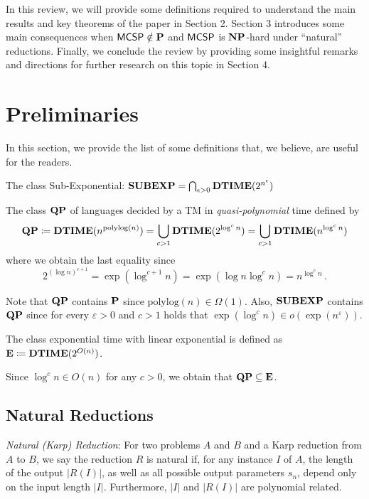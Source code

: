 \documentclass[11pt]{article}
\begin{document}
In this review, we will provide some definitions required to understand the main results and key theorems of the paper in Section 2. Section 3 introduces some main consequences when $\mathprob{MCSP} \notin \P$ and $\mathprob{MCSP}$ is $\NP$-hard under ``natural'' reductions. Finally, we conclude the review by providing some insightful remarks and directions for further research on this topic in Section 4.

\section{Preliminaries}

In this section, we provide the list of some definitions that, we believe, are useful for the readers.

\begin{definition}
	The class Sub-Exponential: $\class{SUBEXP} = \bigcap_{\epsilon > 0} \TIME(2^{n^{\epsilon}})$
\end{definition}

\begin{definition}
	The class $\class{QP}$ of languages decided by a TM in
	\emph{quasi-polynomial} time defined by
	\[
	\class{QP}
	\coloneqq
	\TIME(n^{\mathrm{polylog}(n)})
	=
	\bigcup_{c > 1}\TIME(2^{\log^c n})
	=
	\bigcup_{c > 1}\TIME(n^{\log^c n})
	\]
	where we obtain the last equality since
	\[
	2^{(\log n)^{c+1}} = \exp( \log^{c+1} n ) = \exp( \log n \log^c n )
	= n^{\log^c n} \,.
	\]
\end{definition}

Note that $\class{QP}$ contains $\P$ since
$\mathrm{polylog}(n) \in \Omega(1)$.
Also, $\class{SUBEXP}$ contains $\class{QP}$ since for every
$\varepsilon > 0$ and $c > 1$ holds that
$\exp(\log^c n) \in o(\exp(n^\varepsilon))$.

\begin{definition}
	The class exponential time with linear exponential is defined as
	$\class{E} \coloneqq \TIME(2^{O(n)})$.
\end{definition}

Since $\log^c n \in O(n)$ for any $c > 0$, we obtain that
$\class{QP} \subseteq \class E$.


\subsection{Natural Reductions}

\begin{definition}
	\textit{Natural (Karp) Reduction}: For two problems $A$ and $B$ and a Karp reduction from $A$ to $B$, we say the reduction $R$ is natural if, for any instance $I$ of $A$, the length of the output $|R(I)|$, as well as all possible output parameters $s_n$, depend only on the input length $|I|$. Furthermore, $|I|$ and $|R(I)|$ are polynomial related.
\end{definition}
	
\end{document}
